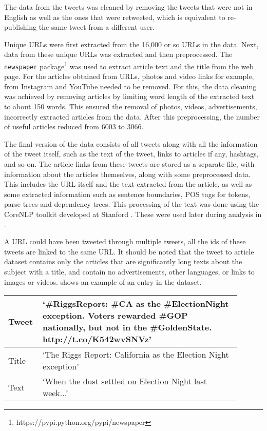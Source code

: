 The data from the tweets was cleaned by removing the tweets that were not in English as well as the ones that were retweeted, which is equivalent to re-publishing the same tweet from a different user. 

Unique URLs were first extracted from the 16,000 or so URLs in the data. Next, data from these unique URLs was extracted and then preprocessed. The \texttt{newspaper} package\footnote{https://pypi.python.org/pypi/newspaper} was used to extract article text and the title from the web page. For the articles obtained from URLs, photos and video links for example, from Instagram and YouTube needed to be removed. For this, the data cleaning was achieved by removing articles by limiting word length of the extracted text to about 150 words. This ensured the removal of photos, videos, advertisements, incorrectly extracted articles from the data.  After this preprocessing, the number of useful articles reduced from 6003 to 3066.

The final version of the data consists of all tweets along with all the information of the tweet itself, such as the text of the tweet, links to articles if any, hashtags, and so on. The article links from these tweets are stored as a separate file, with information about the articles themselves, along with some preprocessed data. This includes the URL itself and the text extracted from the article, as well as some extracted information such as sentence boundaries, POS tags for tokens, parse trees and dependency trees. This processing of the text was done using the CoreNLP toolkit developed at Stanford . These were used later during analysis in .

A URL could have been tweeted through multiple tweets, all the ids of these tweets are linked to the same URL. It should be noted that the tweet to article dataset contains only the articles that are significantly long texts about the subject with a title, and contain no advertisements, other languages, or links to images or videos.  shows an example of an entry in the dataset.

\begin{table}[htbp]
\centering
\begin{tabular}{|p{0.1\linewidth}|p{0.8\linewidth}|}
\hline
Tweet & `\#RiggsReport: \#CA as the \#ElectionNight exception. Voters rewarded \#GOP nationally, but not in the \#GoldenState. http://t.co/K542wvSNVz' \\ \hline
Title & `The Riggs Report: California as the Election Night exception'                                                                                 \\ \hline
Text  & `When the dust settled on Election Night last week...'                                                                                         \\ \hline
\end{tabular}
\label{tab:ex1}
\end{table}